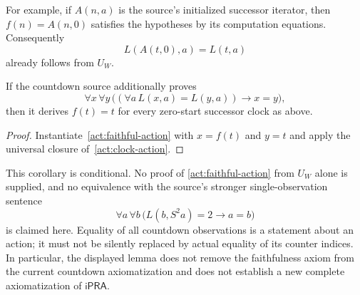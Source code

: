 For example, if $A(n,a)$ is the source's initialized successor iterator,
then $f(n)=A(n,0)$ satisfies the hypotheses by its computation equations.
Consequently
\[
                       L(A(t,0),a)=L(t,a)
\]
already follows from $U_W$.

\begin{corollary}
\label{act:faithfulness}
If the countdown source additionally proves
\[
 \forall x\,\forall y\,
 \bigl((\forall a\,L(x,a)=L(y,a))\longrightarrow x=y\bigr),
 \tag{Faithful action}\label{act:faithful-action}
\]
then it derives $f(t)=t$ for every zero-start successor clock as above.
\end{corollary}

\begin{proof}
Instantiate~\eqref{act:faithful-action} with $x=f(t)$ and $y=t$ and
apply the universal closure of~\eqref{act:clock-action}.
\end{proof}

This corollary is conditional. No proof of
\eqref{act:faithful-action} from $U_W$ alone is supplied, and no
equivalence with the source's stronger single-observation sentence
\[
        \forall a\,\forall b\,
        \bigl(L(b,S^2a)=2\longrightarrow a=b\bigr)
\]
is claimed here. Equality of all countdown observations is a statement
about an action; it must not be silently replaced by actual equality of
its counter indices. In particular, the displayed lemma does not remove
the faithfulness axiom from the current countdown axiomatization and
does not establish a new complete axiomatization of $\mathsf{iPRA}$.
